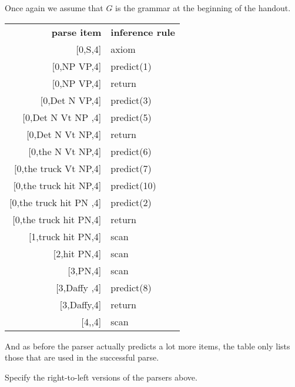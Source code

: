 \begin{prooftree}
\end{prooftree}

\begin{examplebox}
    Once again we assume that $G$ is the grammar at the beginning of the handout.
    \begin{center}
        \begin{tabular}{r|l}
            \textbf{parse item} & \textbf{inference rule}\\
            $\lbrack$0,\psep S,4] & axiom\\
            $\lbrack$0,NP VP\psep,4] & predict(1)\\
            $\lbrack$0,\psep NP VP,4] & return\\
            $\lbrack$0,Det N \psep VP,4] & predict(3)\\
            $\lbrack$0,Det N Vt NP \psep,4] & predict(5)\\
            $\lbrack$0,\psep Det N Vt NP,4] & return\\
            $\lbrack$0,the \psep N Vt NP,4] & predict(6)\\
            $\lbrack$0,the truck \psep Vt NP,4] & predict(7)\\
            $\lbrack$0,the truck hit \psep NP,4] & predict(10)\\
            $\lbrack$0,the truck hit PN \psep,4] & predict(2)\\
            $\lbrack$0,\psep the truck hit PN,4] & return\\
            $\lbrack$1,\psep truck hit PN,4] & scan\\
            $\lbrack$2,\psep hit PN,4] & scan\\
            $\lbrack$3,\psep PN,4] & scan\\
            $\lbrack$3,Daffy \psep,4] & predict(8)\\
            $\lbrack$3,\psep Daffy,4] & return\\
            $\lbrack$4,\psep,4] & scan
        \end{tabular}
    \end{center}
    And as before the parser actually predicts a lot more items, the table only lists those that are used in the successful parse.
\end{examplebox}
\begin{exercise}
    Specify the right-to-left versions of the parsers above.
\end{exercise}
